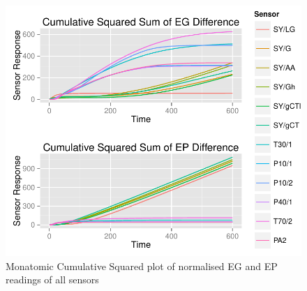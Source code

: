 \documentclass[twocolumn]{article}
\begin{document}
\begin{figure}[h!]
	\includegraphics[trim = 0mm 0mm 0mm 0mm, clip, scale=0.55]{cumulativeSquaredSum.pdf}
	\caption{Monatomic Cumulative Squared plot of normalised EG and EP readings of all sensors}
	\label{fig:cumulativeSquaredSum}
\end{figure}
\end{document}
